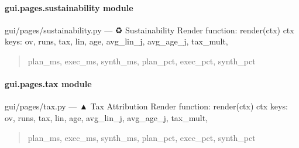 \documentclass[letterpaper,10pt,english]{sphinxmanual}
\begin{document}
\paragraph{gui.pages.sustainability module}
\label{\detokenize{gui.pages.sustainability:module-gui.pages.sustainability}}\label{\detokenize{gui.pages.sustainability:gui-pages-sustainability-module}}\label{\detokenize{gui.pages.sustainability::doc}}
\sphinxAtStartPar
gui/pages/sustainability.py  —  ♻  Sustainability
Render function: render(ctx)
ctx keys: ov, runs, tax, lin, age, avg\_lin\_j, avg\_age\_j, tax\_mult,
\begin{quote}

\sphinxAtStartPar
plan\_ms, exec\_ms, synth\_ms, plan\_pct, exec\_pct, synth\_pct
\end{quote}

\begin{fulllineitems}
\label{\detokenize{gui.pages.sustainability:gui.pages.sustainability.render}}
\pysigstartsignatures
\pysiglinewithargsret
{}
{}
{}
\pysigstopsignatures
\end{fulllineitems}


\sphinxstepscope


\paragraph{gui.pages.tax module}
\label{\detokenize{gui.pages.tax:module-gui.pages.tax}}\label{\detokenize{gui.pages.tax:gui-pages-tax-module}}\label{\detokenize{gui.pages.tax::doc}}
\sphinxAtStartPar
gui/pages/tax.py  —  ▲  Tax Attribution
Render function: render(ctx)
ctx keys: ov, runs, tax, lin, age, avg\_lin\_j, avg\_age\_j, tax\_mult,
\begin{quote}

\sphinxAtStartPar
plan\_ms, exec\_ms, synth\_ms, plan\_pct, exec\_pct, synth\_pct
\end{quote}
\end{document}
